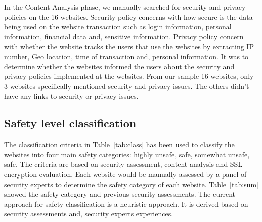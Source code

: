 \documentclass[conference,letterpaper]{IEEEtran}
\begin{document}
In the Content Analysis phase, we manually searched for security and
privacy policies on the 16 websites. Security policy concerns with how
secure is the data being used on the website transaction such as login
information, personal information, financial data and, sensitive
information. Privacy policy concern with whether the website tracks
the users that use the websites by extracting IP number, Geo location,
time of transaction and, personal information. It was to determine
whether the websites informed the users about the security and privacy
policies implemented at the websites.  From our sample 16 websites,
only 3 websites specifically mentioned security and privacy
issues. The others didn't have any links to security or privacy
issues.

\subsection{Safety level classification}

The classification criteria in Table~\ref{tab:class} has been used to
classify the websites into four main safety categories: highly unsafe,
safe, somewhat unsafe, safe. The criteria are based on security
assessment, content analysis and SSL encryption evaluation. Each
website would be manually assessed by a panel of security experts to
determine the safety category of each website. Table~\ref{tab:sum}
showed the safety category and  previous security assessments. The
current approach for safety classification is a heuristic approach. It
is derived based on security assessments and, security experts
experiences.
\end{document}
